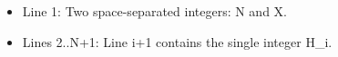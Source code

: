 \begin{itemize}
	\item      Line 1: Two space-separated integers: N and X.    
	\item      Lines 2..N+1: Line i+1 contains the single integer H\_i.    
\end{itemize}

\